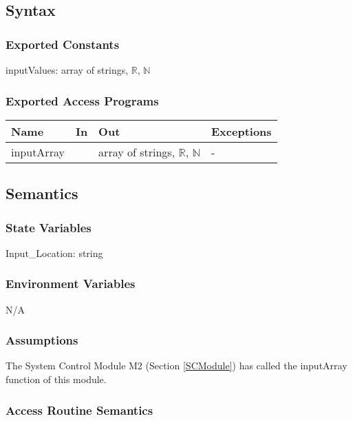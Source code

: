 \documentclass[12pt, titlepage]{article}
\begin{document}
\subsection{Syntax}

\subsubsection{Exported Constants}
inputValues: array of strings, $\mathbb{R}$, $\mathbb{N}$\\


\subsubsection{Exported Access Programs}

\begin{center}
	\begin{tabular}{p{2cm} p{4cm} p{4cm} p{2cm}}
		\hline
		\textbf{Name} & \textbf{In} & \textbf{Out} & \textbf{Exceptions} \\
		\hline
		inputArray & & array of strings, $\mathbb{R}$, $\mathbb{N}$ & - \\
		\hline
	\end{tabular}
\end{center}

\subsection{Semantics}

\subsubsection{State Variables}

Input\_Location: string

\subsubsection{Environment Variables}

N/A

\subsubsection{Assumptions}

The System Control Module M2 (Section \ref{SCModule}) has called the inputArray function of this module.

\subsubsection{Access Routine Semantics}
\end{document}
